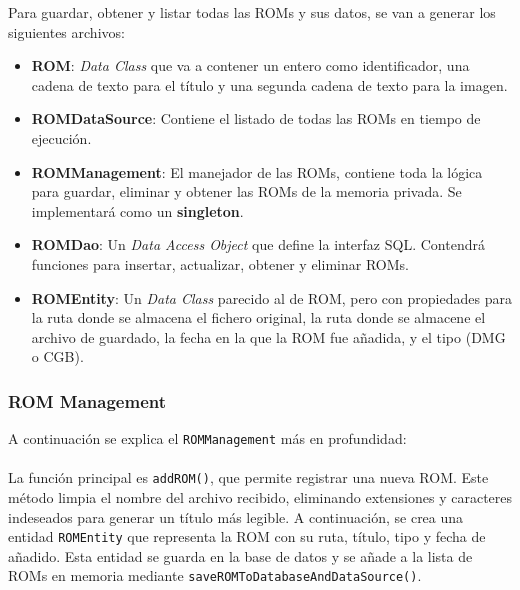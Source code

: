 Para guardar, obtener y listar todas las ROMs y sus datos, se van a generar los siguientes archivos:
\begin{itemize}
    \item \textbf{ROM}: \textit{Data Class} que va a contener un entero como identificador, una cadena de texto para el título y una segunda cadena de texto para la imagen.
    \item \textbf{ROMDataSource}: Contiene el listado de todas las ROMs en tiempo de ejecución.
    \item \textbf{ROMManagement}: El manejador de las ROMs, contiene toda la lógica para guardar, eliminar y obtener las ROMs de la memoria privada. Se implementará como un \textbf{singleton}.
    \item \textbf{ROMDao}: Un \textit{Data Access Object} que define la interfaz SQL. Contendrá funciones para insertar, actualizar, obtener y eliminar ROMs.
    \item \textbf{ROMEntity}: Un \textit{Data Class} parecido al de ROM, pero con propiedades para la ruta donde se almacena el fichero original, la ruta donde se almacene el archivo de guardado, la fecha en la que la ROM fue añadida, y el tipo (DMG o CGB).
\end{itemize}

\subsubsection{ROM Management}
A continuación se explica el \texttt{ROMManagement} más en profundidad:
\\\\
La función principal es \texttt{addROM()}, que permite registrar una nueva ROM. Este método limpia el nombre del archivo recibido, eliminando extensiones y caracteres indeseados para generar un título más legible. A continuación, se crea una entidad \texttt{ROMEntity} que representa la ROM con su ruta, título, tipo y fecha de añadido. Esta entidad se guarda en la base de datos y se añade a la lista de ROMs en memoria mediante \texttt{saveROMToDatabaseAndDataSource()}.

